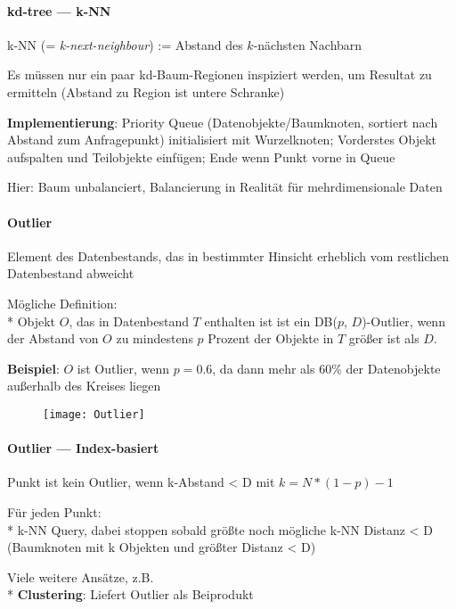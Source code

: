 \paragraph{kd-tree --- k-NN}
\begin{items}
	\item k-NN (= \emph{k-next-neighbour}) := Abstand des \( k \)-nächsten Nachbarn
	\item Es müssen nur ein paar kd-Baum-Regionen inspiziert werden, um Resultat zu ermitteln (Abstand zu Region ist untere Schranke)
	\item \textbf{Implementierung}: Priority Queue (Datenobjekte/Baumknoten, sortiert nach Abstand zum Anfragepunkt) initialisiert mit Wurzelknoten; Vorderstes Objekt aufspalten und Teilobjekte einfügen; Ende wenn Punkt vorne in Queue
	\item Hier: Baum unbalanciert, Balancierung in Realität für mehrdimensionale Daten
\end{items}

\paragraph{Outlier}
\begin{items}
	\item Element des Datenbestands, das in bestimmter Hinsicht erheblich vom restlichen Datenbestand abweicht
	\item Mögliche Definition: \\*
		Objekt \( O \), das in Datenbestand \( T \) enthalten ist ist ein DB(\( p \), \( D \))-Outlier, wenn der Abstand von \( O \) zu mindestens \( p \) Prozent der Objekte in \( T \) größer ist als \( D \).
	\item \textbf{Beispiel}: \( O \) ist Outlier, wenn \( p=0.6 \), da dann mehr als \( 60\% \) der Datenobjekte außerhalb des Kreises liegen
\end{items}
\begin{figure}[H]\centering\label{Outlier}\texttt{[image: Outlier]}\end{figure}

\paragraph{Outlier --- Index-basiert}
\begin{items}
	\item Punkt ist kein Outlier, wenn k-Abstand < D mit $k = N * (1 - p) - 1$
	\item Für jeden Punkt:\\*
		k-NN Query, dabei stoppen sobald größte noch mögliche k-NN Distanz < D  (Baumknoten mit k Objekten und größter Distanz < D)
	\item Viele weitere Ansätze, z.B. \\*
		\textbf{Clustering}: Liefert Outlier als Beiprodukt
\end{items}



